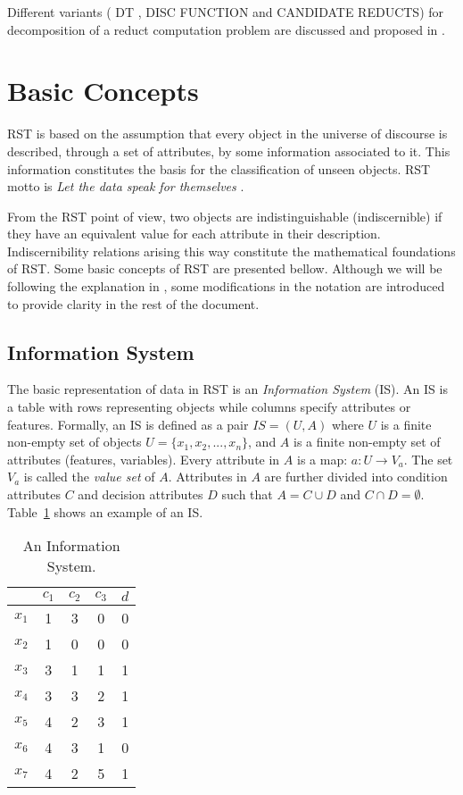 \documentclass[authoryear,11pt]{elsarticle}
\makeatletter
\newcommand{\setword}[2]{%
  \phantomsection
  #1\def\@currentlabel{\unexpanded{#1}}\label{#2}%
}
\makeatother
\begin{document}
  Different variants (\setword{DT}{DT}, DISC FUNCTION and CANDIDATE REDUCTS) for decomposition of a reduct 
  computation problem are discussed and proposed in \citep{Strakowski08}.


\section{Basic Concepts}\label{basicConcepts}
  RST is based on the assumption that every object in the universe of discourse is described, through a 
  set of attributes, by some information associated to it. This information constitutes the basis for the
  classification of unseen objects. RST motto is \textit{Let the data speak for themselves} \citep{Tiwari14}.
  
  From the RST point of view, two objects are indistinguishable (indiscernible) if they have an equivalent 
  value for each attribute in their description. Indiscernibility relations arising this way constitute the
  mathematical foundations of RST. 
  Some basic concepts of RST are presented bellow. Although we will be following the explanation 
  in \citep{Polkowski00}, some modifications in the notation are introduced to provide clarity in the rest 
  of the document.
  
\subsection{Information System}
  The basic representation of data in RST is an \emph{Information System} (IS). An IS is a table with rows
  representing objects while columns specify attributes or features. Formally, an IS is defined as a pair
  $IS=(U,A)$ where $U$ is a finite non-empty set of objects $U=\lbrace x_1,x_2,...,x_n\rbrace$, and $A$ is a 
  finite non-empty set
  of attributes (features, variables). Every attribute in $A$ is a map: $a: U \rightarrow V_a$. The set $V_a$ is
  called the \textit{value set} of $A$. Attributes in $A$ are further divided into condition attributes $C$ and 
  decision attributes $D$ such that $A=C \cup D$ and $C \cap D =\emptyset$. 
  Table~\ref{tab_IS} shows an example of an IS.
  
  
 \begin{table}[htb]
		\caption{An Information System.} \label{tab_IS}
		\centering
 	\begin{tabular}{c||c|c|c||c}
 			  & $c_1$ & $c_2$ &  $c_3$ & $d$ \\
 		\hline \hline
		$x_1$ &   1   &    3  &  0  &   0   \\
		$x_2$ &   1   &    0  &  0  &   0   \\
		$x_3$ &   3   &    1  &  1  &   1   \\
		$x_4$ &   3   &    3  &  2  &   1   \\
		$x_5$ &   4   &    2  &  3  &   1   \\
		$x_6$ &   4   &    3  &  1  &   0   \\
		$x_7$ &   4   &    2  &  5  &   1   \\
 	\end{tabular}             
 \end{table}
 
\end{document}
